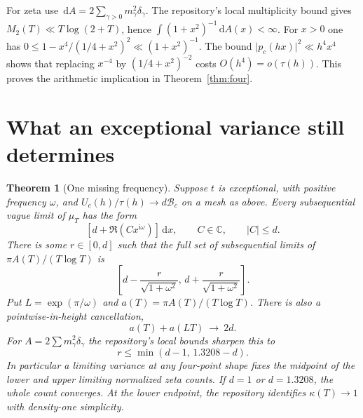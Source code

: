 \documentclass[11pt,letterpaper]{article}
\newtheorem{theorem}{Theorem}[section]
\newcommand{\dd}{\,\mathrm d}
\newcommand{\ii}{\mathrm i}
\newcommand{\abs}[1]{\lvert#1\rvert}
\newcommand{\BB}{\mathcal B}
\begin{document}
For zeta use $\dd A=2\sum_{\gamma>0}m_\gamma^2\delta_\gamma$. The repository's local multiplicity bound gives $M_2(T)\ll T\log(2+T)$, hence $\int(1+x^2)^{-1}\dd A(x)<\infty$. For $x>0$ one has $0\le1-x^4/(1/4+x^2)^2\ll(1+x^2)^{-1}$. The bound $\abs{p_c(hx)}^2\ll h^4x^4$ shows that replacing $x^{-4}$ by $(1/4+x^2)^{-2}$ costs $O(h^4)=o(\tau(h))$. This proves the arithmetic implication in Theorem~\ref{thm:four}.

\section{What an exceptional variance still determines}\label{sec:tangent}
\begin{theorem}[One missing frequency]\label{thm:tangent}
Suppose $t$ is exceptional, with positive frequency $\omega$, and $U_c(h)/\tau(h)\to d\BB_c$ on a mesh as above. Every subsequential vague limit of $\mu_T$ has the form
\begin{equation}\label{eq:tan}
 [d+\Re(Cx^{\ii\omega})]\dd x,\qquad C\in\mathbb C,\qquad \abs C\le d.
\end{equation}
There is some $r\in[0,d]$ such that the full set of subsequential limits of $\pi A(T)/(T\log T)$ is
\[
 \left[d-\frac r{\sqrt{1+\omega^2}},\,d+\frac r{\sqrt{1+\omega^2}}\right].
\]
Put $L=\exp(\pi/\omega)$ and $a(T)=\pi A(T)/(T\log T)$. There is also a pointwise-in-height cancellation,
\[
 a(T)+a(LT)\ \longrightarrow\ 2d .
\]
For $A=2\sum m_\gamma^2\delta_\gamma$ the repository's local bounds sharpen this to
\begin{equation}\label{eq:cap}
 r\le\min(d-1,\,1.3208-d).
\end{equation}
In particular a limiting variance at any four-point shape fixes the midpoint of the lower and upper limiting normalized zeta counts. If $d=1$ or $d=1.3208$, the whole count converges. At the lower endpoint, the repository identifies $\kappa(T)\to1$ with density-one simplicity.
\end{theorem}
\end{document}
